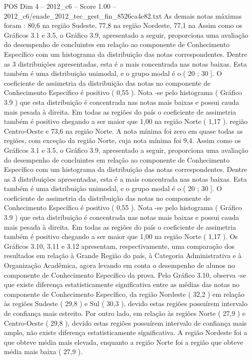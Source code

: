 \begin{textsample}{POS Dim 4 – 2012\_c6 – Score 1.00 – 2012\_c6/enade\_2012\_tec\_gest\_fin\_8526ca4e82.txt}
As demais notas máximas foram : 80,6 na região Sudeste, 77,8 na região Nordeste, 77,1 na Assim como os Gráficos 3.1 e 3.5, o Gráfico 3.9, apresentado a seguir, proporciona uma avaliação do desempenho de concluintes em relação ao componente de Conhecimento Específico com um histograma da distribuição das notas correspondentes.
Dentre as 3 distribuições apresentadas, esta é a mais concentrada nas notas baixas.
Esta também é uma distribuição unimodal, e o grupo modal é o ( 20 ; 30 ].
O coeficiente de assimetria da distribuição das notas no componente de Conhecimento Específico é positivo ( 0,55 ).
Nota -se pelo histograma ( Gráfico 3.9 ) que esta distribuição é concentrada nas notas mais baixas e possui cauda mais pesada à direita.
Em todas as regiões do país o coeficiente de assimetria também é positivo chegando a ser maior que 1,00 na região Norte ( 1,17 ). região Centro-Oeste e 73,6 na região Norte.
A nota mínima foi zero em quase todas as regiões, com exceção da região Norte, cuja nota mínima foi 9,4.
Assim como os Gráficos 3.1 e 3.5, o Gráfico 3.9, apresentado a seguir, proporciona uma avaliação do desempenho de concluintes em relação ao componente de Conhecimento Específico com um histograma da distribuição das notas correspondentes.
Dentre as 3 distribuições apresentadas, esta é a mais concentrada nas notas baixas.
Esta também é uma distribuição unimodal, e o grupo modal é o ( 20 ; 30 ].
O coeficiente de assimetria da distribuição das notas no componente de Conhecimento Específico é positivo ( 0,55 ).
Nota -se pelo histograma ( Gráfico 3.9 ) que esta distribuição é concentrada nas notas mais baixas e possui cauda mais pesada à direita.
Em todas as regiões do país o coeficiente de assimetria também é positivo chegando a ser maior que 1,00 na região Norte ( 1,17 ).
Os Gráficos 3.10, 3.11 e 3.12 apresentam, respectivamente, uma comparação dos resultados em relação à Grande Região do país, à Categoria Administrativa e à Organização Acadêmica, agora levando em conta o desempenho de alunos no componente de Conhecimento Específico da prova.
Pelo Gráfico 3.10, observa -se que existe diferença estatisticamente significativa entre as médias das notas no componente de Conhecimento Específico, da região Nordeste ( 32,2 ) em relação às regiões Sudeste ( 29,8 ) e Sul ( 30,3 ), devido estas regiões possuírem intervalo de confiança mais estreito.
Por outro lado, em relação às regiões Norte ( 27,9 ) e Centro-Oeste ( 29,8 ), devido estas regiões possuírem intervalo de confiança mais amplo, não existe diferença estatisticamente significativa.
A região Nordeste foi a que obteve média mais elevada, enquanto a região Norte foi a região que obteve média mais baixa ( 27,9 ).

\end{textsample}
